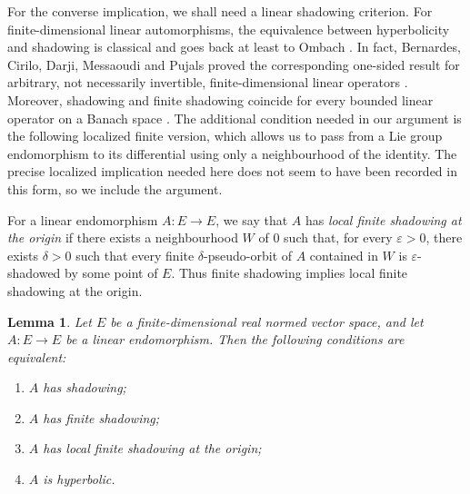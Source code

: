 \documentclass[12pt]{amsart}
\newtheorem{lemma}[theorem]{Lemma}
\theoremstyle{definition}
\numberwithin{equation}{section}
\theoremstyle{remark}
\begin{document}
For the converse implication, we shall need a linear shadowing
criterion. For finite-dimensional linear automorphisms, the equivalence
between hyperbolicity and shadowing is classical and goes back at least
to Ombach \cite{Ombach1994}. In fact, Bernardes, Cirilo, Darji,
Messaoudi and Pujals proved the corresponding one-sided result for
arbitrary, not necessarily invertible, finite-dimensional linear
operators \cite[Lemma~45]{BernardesEtAl2018}. Moreover, shadowing and
finite shadowing coincide for every bounded linear operator on a Banach
space \cite{BernardesPeris}. The additional condition needed in our
argument is the following localized finite version, which allows us to
pass from a Lie group endomorphism to its differential using only a
neighbourhood of the identity. The precise localized implication needed here does not seem to have
been recorded in this form, so we include the argument.

For a linear endomorphism $A:E\to E$, we say that $A$ has
\emph{local finite shadowing at the origin} if there exists a
neighbourhood $W$ of $0$ such that, for every $\varepsilon>0$, there
exists $\delta>0$ such that every finite $\delta$-pseudo-orbit of $A$
contained in $W$ is $\varepsilon$-shadowed by some point of $E$. Thus finite
shadowing implies local finite shadowing at the origin.

\begin{lemma}\label{LineShadEqu}
Let $E$ be a finite-dimensional real normed vector space, and let
$A:E\to E$ be a linear endomorphism. Then the following conditions are
equivalent:
\begin{enumerate}
\item $A$ has shadowing;
\item $A$ has finite shadowing;
\item $A$ has local finite shadowing at the origin;
\item $A$ is hyperbolic.
\end{enumerate}
\end{lemma}
\end{document}

